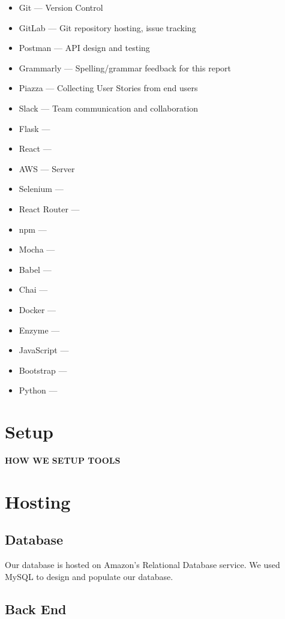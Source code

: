 \documentclass[12pt]{article}
\begin{document}
\begin{itemize}
	\item Git		--- Version Control
	\item GitLab	--- Git repository hosting, issue tracking
	\item Postman	--- API design and testing %
	\item Grammarly	--- Spelling/grammar feedback for this report
	\item Piazza	--- Collecting User Stories from end users
	\item Slack		--- Team communication and collaboration
	\item Flask     --- 
	\item React     ---
	\item AWS       --- Server
	\item Selenium --- 
	\item React Router --- 
	\item npm --- 
	\item Mocha --- 
	\item Babel --- 
	\item Chai --- 
	\item Docker --- 
	\item Enzyme --- 
	\item JavaScript --- 
	\item Bootstrap --- 
	\item Python --- 

\end{itemize}

\section{Setup}

\textbf{HOW WE SETUP TOOLS}

\section{Hosting}

\subsection{Database}

Our database is hosted on Amazon's Relational Database service. We used MySQL to design and populate our database.

\subsection{Back End}
\end{document}
